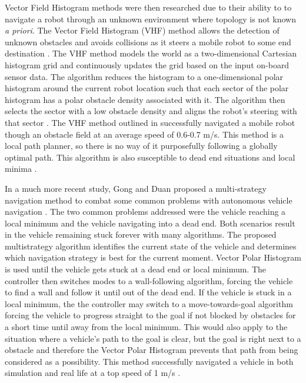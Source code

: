 \documentclass[12pt,onecolumn]{article}
\begin{document}
Vector Field Histogram methods were then researched due to their ability to to navigate a robot through an unknown environment where topology is not known \textit{a priori}. The Vector Field Histogram (VHF) method allows the detection of unknown obstacles and avoids collisions as it steers a mobile robot to some end destination \cite{Borenstein&Koren1991}. The VHF method models the world as a two-dimensional Cartesian histogram grid and continuously updates the grid based on the input on-board sensor data. The algorithm reduces the histogram to a one-dimensional polar histogram around the current robot location such that each sector of the polar histogram has a polar obstacle density associated with it. The algorithm then selects the sector with a low obstacle density and aligns the robot's steering with that sector \cite{Borenstein&Koren1991}. The VHF method outlined in \cite{Borenstein&Koren1991} successfully navigated a mobile robot though an obstacle field at an average speed of 0.6-0.7 m/s. This method is a local path planner, so there is no way of it purposefully following a globally optimal path. This algorithm is also susceptible to dead end situations and local minima \cite{Borenstein&Koren1991}.

In a much more recent study, Gong and Duan proposed a multi-strategy navigation method to combat some common problems with autonomous vehicle navigation \cite{Gong&Duan2009}. The two common problems addressed were the vehicle reaching a local minimum and the vehicle navigating into a dead end. Both scenarios result in the vehicle remaining stuck forever with many algorithms. The proposed multistrategy algorithm identifies the current state of the vehicle and determines which navigation strategy is best for the current moment. Vector Polar Histogram is used until the vehicle gets stuck at a dead end or local minimum. The controller then switches modes to a wall-following algorithm, forcing the vehicle to find a wall and follow it until out of the dead end. If the vehicle is stuck in a local minimum, the the controller may switch to a move-towards-goal algorithm forcing the vehicle to progress straight to the goal if not blocked by obstacles for a short time until away from the local minimum. This would also apply to the situation where a vehicle's path to the goal is clear, but the goal is right next to a obstacle and therefore the Vector Polar Histogram prevents that path from being considered as a possibility. This method successfully navigated a vehicle in both simulation and real life at a top speed of 1 m/s \cite{Gong&Duan2009}.
\end{document}
